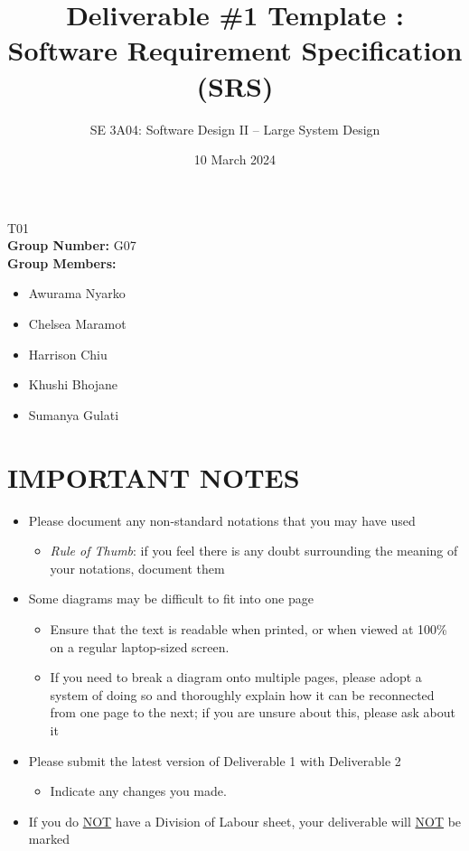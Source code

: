 \documentclass[]{article}
\title{Deliverable \#1 Template : Software Requirement Specification (SRS)}
\author{SE 3A04: Software Design II -- Large System Design}
\date{10 March 2024}
\begin{document}
\maketitle
{} T01\\
{\bf Group Number:} G07 \\
{\bf Group Members:}
\begin{itemize}
	\item Awurama Nyarko
	\item Chelsea Maramot
	\item Harrison Chiu
	\item Khushi Bhojane
	\item Sumanya Gulati
\end{itemize}

\section*{IMPORTANT NOTES}
\begin{itemize}
	\item Please document any non-standard notations that you may have used
	\begin{itemize}
		\item \emph{Rule of Thumb}: if you feel there is any doubt surrounding the meaning of your notations, document them
	\end{itemize}
	\item Some diagrams may be difficult to fit into one page
	\begin{itemize}
		\item Ensure that the text is readable when printed, or when viewed at 100\% on a regular laptop-sized screen.
		\item If you need to break a diagram onto multiple pages, please adopt a system of doing so and thoroughly explain how it can be reconnected from one page to the next; if you are unsure about this, please ask about it
	\end{itemize}
	\item Please submit the latest version of Deliverable 1 with Deliverable 2
	\begin{itemize}
		\item Indicate any changes you made.
	\end{itemize}
	\item If you do \underline{NOT} have a Division of Labour sheet, your deliverable will \underline{NOT} be marked
\end{itemize}
\end{document}
